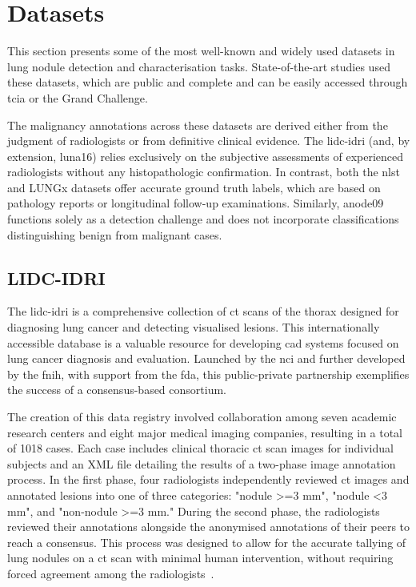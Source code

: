 \chapter{Datasets}
This section presents some of the most well-known and widely used datasets in lung nodule detection and characterisation tasks. State-of-the-art studies used these datasets, which are public and complete and can be easily accessed through \ac{tcia} or the Grand Challenge.

The malignancy annotations across these datasets are derived either from the judgment of radiologists or from definitive clinical evidence. The \acs{lidc-idri} (and, by extension, \acs{luna16}) relies exclusively on the subjective assessments of experienced radiologists without any histopathologic confirmation. In contrast, both the \acs{nlst} and LUNGx datasets offer accurate ground truth labels, which are based on pathology reports or longitudinal follow-up examinations. Similarly, \acs{anode09} functions solely as a detection challenge and does not incorporate classifications distinguishing benign from malignant cases.

\section{LIDC-IDRI}\label{subsec:lidc}
The \ac{lidc-idri} is a comprehensive collection of \ac{ct} scans of the thorax designed for diagnosing lung cancer and detecting visualised lesions. This internationally accessible database is a valuable resource for developing \ac{cad} systems focused on lung cancer diagnosis and evaluation. Launched by the \ac{nci} and further developed by the \ac{fnih}, with support from the \ac{fda}, this public-private partnership exemplifies the success of a consensus-based consortium.

The creation of this data registry involved collaboration among seven academic research centers and eight major medical imaging companies, resulting in a total of 1018 cases. Each case includes clinical thoracic \ac{ct} scan images for individual subjects and an XML file detailing the results of a two-phase image annotation process. In the first phase, four radiologists independently reviewed \ac{ct} images and annotated lesions into one of three categories: "nodule >=3 mm", "nodule <3 mm", and "non-nodule >=3 mm." During the second phase, the radiologists reviewed their annotations alongside the anonymised annotations of their peers to reach a consensus. This process was designed to allow for the accurate tallying of lung nodules on a \ac{ct} scan with minimal human intervention, without requiring forced agreement among the radiologists~\cite{armato_iii_data_2015}.

